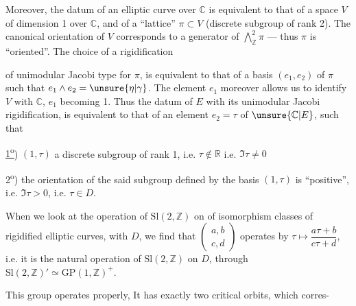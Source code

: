 
Moreover, the datum of an elliptic curve  over $\mathbb C$ is equivalent to that of a space $V$ of dimension 1 over $\mathbb C$, and of a ``lattice'' $\pi\subset V$ (discrete subgroup of rank 2).
The canonical orientation of $V$ corresponds to a generator \unsure{$\eta|\gamma$} of $\bigwedge^2_{\mathbb Z}\pi$ --- thus $\pi$ is ``oriented''. The choice of a rigidification


of unimodular Jacobi type for $\pi$, is equivalent to that of a basis $(e_1,e_2)$ of $\pi$  such that $e_1\wedge e_2=\unsure{\eta|\gamma}$. The element $e_1$  moreover allows us to identify $V$ with $\mathbb C$, $e_1$ becoming 1. Thus the datum of $E$ with its unimodular Jacobi rigidification, is equivalent to that of an element $e_2=\tau$ of $\unsure{\mathbb C|E}$, such that

\uline{1\textsuperscript{o}}) $(1,\tau)$  a discrete subgroup of rank 1, i.e. $\tau\notin\mathbb R$ i.e. $\Im\tau\ne0$

2\textsuperscript{o}) the orientation of the said subgroup defined by the basis $(1,\tau)$ is ``positive'', i.e. $\Im\tau>0$, i.e. $\tau\in D$.

When we look at the operation of $\mathrm{Sl}(2,\mathbb Z)$ on  of isomorphism classes of rigidified elliptic curves,   with $D$, we find that $\begin{pmatrix}a,b\\c,d\end{pmatrix}$ operates by $\tau\longmapsto\dfrac{a\tau+b}{c\tau+d}$, i.e. it is the natural operation of $\mathrm{Sl}(2,\mathbb Z)$ on $D$, through $\mathrm{Sl}(2,\mathbb Z)'\simeq\mathrm{GP}(1,\mathbb Z)^+$.

This group operates properly, It has exactly two critical orbits, which corres-
